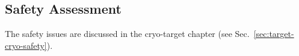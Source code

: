 \begin{safetyen}{10}{5}
\section{Safety Assessment}

The safety issues are discussed in the cryo-target chapter 
(see Sec.~\ref{sec:target-cryo-safety}). 
\end{safetyen}

%
%
%
%
%

